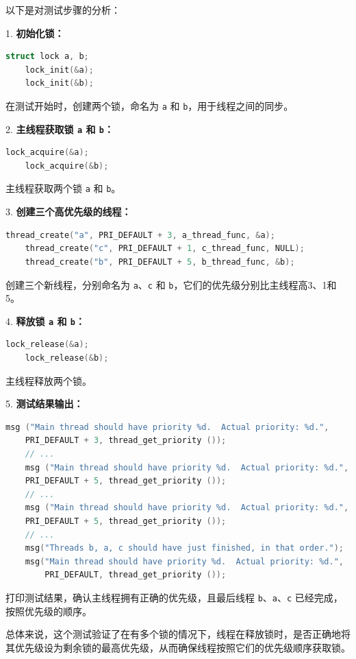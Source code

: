 \documentclass{article}
\begin{document}
以下是对测试步骤的分析：

1. \textbf{初始化锁：}
\begin{lstlisting}[language=C]
    struct lock a, b;
    lock_init(&a);
    lock_init(&b);
\end{lstlisting}

在测试开始时，创建两个锁，命名为 \texttt{a} 和 \texttt{b}，用于线程之间的同步。

2. \textbf{主线程获取锁 \texttt{a} 和 \texttt{b}：}
\begin{lstlisting}[language=C]
    lock_acquire(&a);
    lock_acquire(&b);
\end{lstlisting}

主线程获取两个锁 \texttt{a} 和 \texttt{b}。

3. \textbf{创建三个高优先级的线程：}
\begin{lstlisting}[language=C]
    thread_create("a", PRI_DEFAULT + 3, a_thread_func, &a);
    thread_create("c", PRI_DEFAULT + 1, c_thread_func, NULL);
    thread_create("b", PRI_DEFAULT + 5, b_thread_func, &b);
\end{lstlisting}

创建三个新线程，分别命名为 \texttt{a}、\texttt{c} 和 \texttt{b}，它们的优先级分别比主线程高3、1和5。

4. \textbf{释放锁 \texttt{a} 和 \texttt{b}：}
\begin{lstlisting}[language=C]
    lock_release(&a);
    lock_release(&b);
\end{lstlisting}

主线程释放两个锁。

5. \textbf{测试结果输出：}
\begin{lstlisting}[language=C]
    msg ("Main thread should have priority %d.  Actual priority: %d.",
    PRI_DEFAULT + 3, thread_get_priority ());
    // ...
    msg ("Main thread should have priority %d.  Actual priority: %d.",
    PRI_DEFAULT + 5, thread_get_priority ());
    // ...
    msg ("Main thread should have priority %d.  Actual priority: %d.",
    PRI_DEFAULT + 5, thread_get_priority ());
    // ...
    msg("Threads b, a, c should have just finished, in that order.");
    msg("Main thread should have priority %d.  Actual priority: %d.",
        PRI_DEFAULT, thread_get_priority ());
\end{lstlisting}

打印测试结果，确认主线程拥有正确的优先级，且最后线程 \texttt{b}、\texttt{a}、\texttt{c} 已经完成，按照优先级的顺序。

总体来说，这个测试验证了在有多个锁的情况下，线程在释放锁时，是否正确地将其优先级设为剩余锁的最高优先级，从而确保线程按照它们的优先级顺序获取锁。
\end{document}
